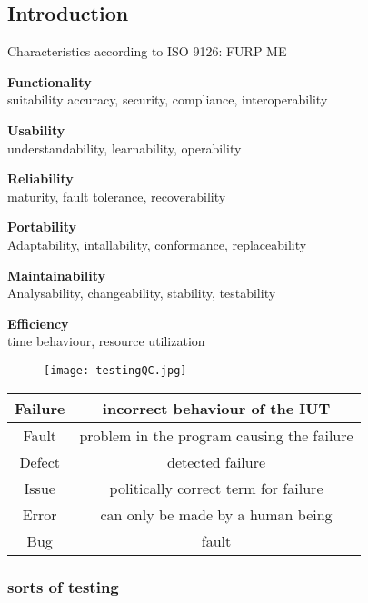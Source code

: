 \subsection{Introduction}
Characteristics according to ISO 9126: FURP ME
\begin{itemize*}
\item \textbf{Functionality}\\
 suitability accuracy, security, compliance, interoperability
\item \textbf{Usability}\\
 understandability, learnability, operability
\item \textbf{Reliability}\\
 maturity, fault tolerance, recoverability
\item \textbf{Portability}\\
 Adaptability, intallability, conformance, replaceability
\item \textbf{Maintainability}\\
 Analysability, changeability, stability, testability
\item \textbf{Efficiency}\\
 time behaviour, resource utilization
\end{itemize*}
 

\begin{figure}[h!]
\centering
\texttt{[image: testingQC.jpg]}
\caption{}
\label{fig:testingQC}
\end{figure}

\begin{tabular}{c|c}
	Failure  & incorrect behaviour of the IUT \\ 
	\hline Fault  & problem in the program causing the failure \\ 
	\hline Defect & detected failure \\ 
	\hline Issue & politically correct term for failure \\ 
	\hline Error & can only be made by a human being  \\ 
	\hline Bug & fault \\ 	
\end{tabular} 

\subsubsection{sorts of testing}

